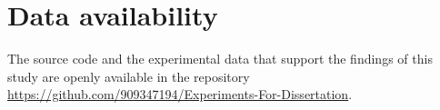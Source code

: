 
\section*{Data availability}
The source code and the experimental data that support the findings of this
study are openly available in the repository \url{https://github.com/909347194/Experiments-For-Dissertation}.
